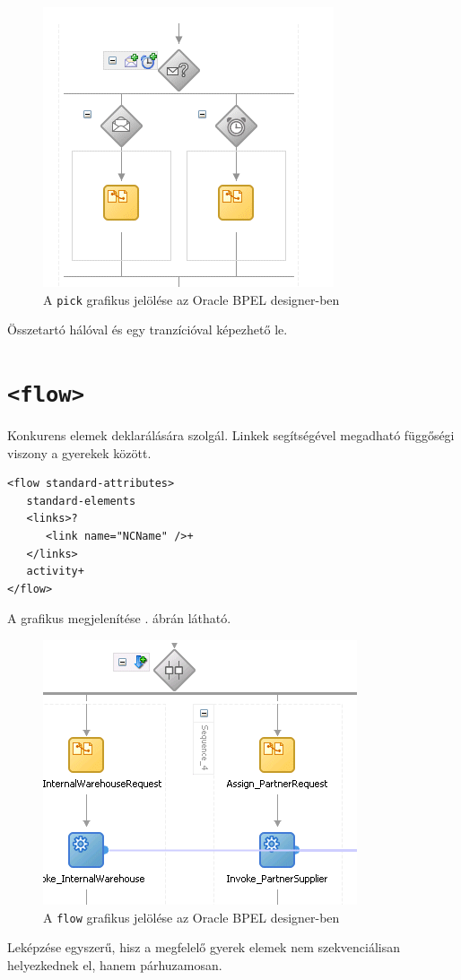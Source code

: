 \begin{figure}[h!]
\centering
\includegraphics[scale=1]{images/pick.png}
\caption{A \texttt{pick} grafikus jelölése az Oracle BPEL designer-ben}
\label{fig:pick}
\end{figure}

Összetartó hálóval és egy tranzícióval képezhető le.


\section{\texttt{<flow>}}

Konkurens elemek deklarálására szolgál. Linkek segítségével megadható függőségi viszony a gyerekek között. 
\begin{verbatim}
<flow standard-attributes>
   standard-elements
   <links>?
      <link name="NCName" />+
   </links>
   activity+
</flow>
\end{verbatim} 
A grafikus megjelenítése . ábrán látható.

\begin{figure}[h!]
\centering
\includegraphics[scale=1]{images/flow.png}
\caption{A \texttt{flow} grafikus jelölése az Oracle BPEL designer-ben}
\label{fig:flow}
\end{figure}
Leképzése egyszerű, hisz a megfelelő gyerek elemek nem szekvenciálisan helyezkednek el, hanem párhuzamosan.
